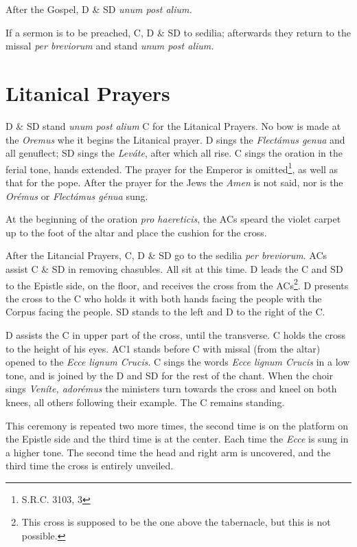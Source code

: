 {    \rubric After the Gospel, D \& SD \textit{unum post alium.}

    \rubric If a sermon is to be preached, C, D \& SD to sedilia; afterwards
    they return to the missal \textit{per breviorum} and stand \textit{unum
    post alium.}

    \section{Litanical Prayers}

    \rubric D \& SD stand \textit{unum post alium} C for the Litanical Prayers.
    No bow is made at the \textit{Oremus} whe it begins the Litanical prayer. D
    sings the \textit{Flectámus genua} and all genuflect; SD sings the
    \textit{Leváte}, after which all rise. C sings the oration in the ferial
    tone, hands extended. The prayer for the Emperor is omitted\footnote{S.R.C.
    3103, 3}, as well as that for the pope. After the prayer for the Jews the
    \textit{Amen} is not said, nor is the \textit{Orémus} or \textit{Flectámus
    génua} sung.

    \rubric At the beginning of the oration \textit{pro haereticis}, the ACs
    speard the violet carpet up to the foot of the altar and place the cushion
    for the cross.

    \rubric After the Litancial Prayers, C, D \& SD go to the sedilia
    \textit{per breviorum}. ACs assist C \& SD in removing chasubles. All sit
    at this time. D leads the C and SD to the Epistle side, on the floor, and
    receives the cross from the ACs\footnote{This cross is supposed to be the
    one above the tabernacle, but this is not possible.}. D presents the cross
    to the C who holds it with both hands facing the people with the Corpus
    facing the people. SD stands to the left and D to the right of the C.

    \rubric D assists the C in upper part of the cross, until the transverse. C
    holds the cross to the height of his eyes. AC1 stands before C with missal
    (from the altar) opened to the \textit{Ecce lignum Crucis}. C sings the
    words \textit{Ecce lignum Crucis} in a low tone, and is joined by the D and
    SD for the rest of the chant. When the choir sings \textit{Veníte,
    adorémus} the ministers turn towards the cross and kneel on both knees, all
    others following their example. The C remains standing.

    \rubric This ceremony is repeated two more times, the second time is on the
    platform on the Epistle side and the third time is at the center. Each time
    the \textit{Ecce} is sung in a higher tone. The second time the head and
    right arm is uncovered, and the third time the cross is entirely unveiled.

}
